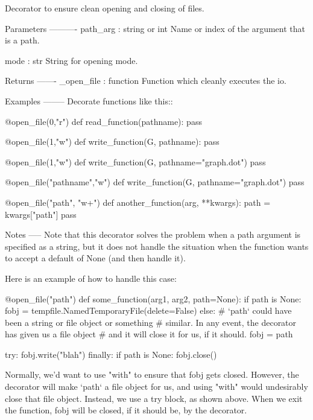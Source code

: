 \begin{DoxyVerb}Decorator to ensure clean opening and closing of files.

Parameters
----------
path_arg : string or int
    Name or index of the argument that is a path.

mode : str
    String for opening mode.

Returns
-------
_open_file : function
    Function which cleanly executes the io.

Examples
--------
Decorate functions like this::

   @open_file(0,"r")
   def read_function(pathname):
       pass

   @open_file(1,"w")
   def write_function(G, pathname):
       pass

   @open_file(1,"w")
   def write_function(G, pathname="graph.dot")
       pass

   @open_file("pathname","w")
   def write_function(G, pathname="graph.dot")
       pass

   @open_file("path", "w+")
   def another_function(arg, **kwargs):
       path = kwargs["path"]
       pass

Notes
-----
Note that this decorator solves the problem when a path argument is
specified as a string, but it does not handle the situation when the
function wants to accept a default of None (and then handle it).

Here is an example of how to handle this case:

  @open_file("path")
  def some_function(arg1, arg2, path=None):
     if path is None:
         fobj = tempfile.NamedTemporaryFile(delete=False)
     else:
         # `path` could have been a string or file object or something
         # similar. In any event, the decorator has given us a file object
         # and it will close it for us, if it should.
         fobj = path

     try:
         fobj.write("blah")
     finally:
         if path is None:
             fobj.close()

Normally, we'd want to use "with" to ensure that fobj gets closed.
However, the decorator will make `path` a file object for us,
and using "with" would undesirably close that file object.
Instead, we use a try block, as shown above.
When we exit the function, fobj will be closed, if it should be, by the decorator.
\end{DoxyVerb}
 \mbox{\label{namespacenetworkx_1_1utils_1_1decorators_abea11d7fda9dda374bd6930d5a0cb65e}} 
